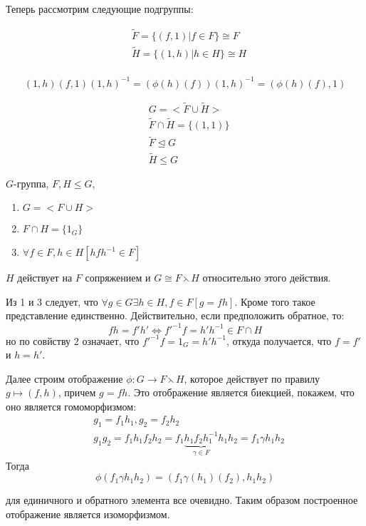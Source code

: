 Теперь рассмотрим следующие подгруппы:

\[
\begin{split}
	& \tilde F = \lbrace\left(f, 1\right) | f \in F\rbrace \cong F\\
	& \tilde H = \lbrace\left(1, h\right) | h \in H\rbrace \cong H\\
\end{split}
\]

\[
	\left(1, h\right)\left(f, 1\right)\left(1, h\right)^{-1} = \left(\phi\left(h\right)\left(f\right)\right)\left(1,h\right)^{-1} = \left(\phi\left(h\right)\left(f\right),1\right)
\]

\[
	\begin{split}
		& G = <\tilde F \cup \tilde H> \\
		& \tilde F \cap \tilde H = \lbrace\left(1,1\right)\rbrace \\
		& \tilde F \trianglelefteq G \\
		& \tilde H \le G 
	\end{split}
\]

\begin{Th}
$G$-группа, $F,H \le G$,
\begin{enumerate}
\item $G = <F \cup H>$ 

\item $F \cap H = \lbrace 1_G \rbrace$

\item $\forall f \in F, h \in H \left[hfh^{-1}\in F\right]$
\end{enumerate}

$H$ действует на $F$ сопряжением и $G \cong F \leftthreetimes H$ относительно этого действия.
\end{Th}

\begin{Proof}
Из 1 и 3 следует, что $\forall g \in G \exists h \in H, f \in F \left[g = fh\right]$. Кроме того такое представление единственно. Действительно, если предположить обратное, то:
\[
	fh = f'h' \Leftrightarrow f'^{-1}f = h'h^{-1} \in F \cap H
\]
но по совйству 2 означает, что $f'^{-1}f = 1_G = h'h^{-1}$, откуда получается, что $f = f'$ и $h = h'$.

Далее строим отображение $\phi : G \rightarrow F \leftthreetimes H$, которое действует по правилу $g \mapsto \left(f,h\right)$, причем $g = fh$. Это отображение является биекцией, покажем, что оно является гомоморфизмом:
\[
	\begin{split}
		& g_1 = f_1 h_1, g_2 = f_2 h_2\\
		& g_1 g_2 = f_1 h_1 f_2 h_2 = f_1 \underbrace{h_1 f_2 h_1^{-1}}_{\gamma \in F} h_1 h_2 = f_1 \gamma h_1 h_2
	\end{split}
\]
Тогда
\[
	\phi\left(f_1 \gamma h_1 h_2\right) = \left(f_1 \gamma \left(h_1\right)\left(f_2\right), h_1 h_2\right)
\]
 
для единичного и обратного элемента все очевидно. Таким образом построенное отображение является изоморфизмом.
\end{Proof}

